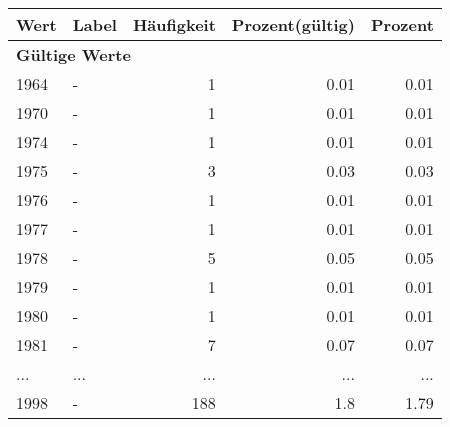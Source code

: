     \begin{longtable}{lXrrr}
     \toprule
     \textbf{Wert} & \textbf{Label} & \textbf{Häufigkeit} & \textbf{Prozent(gültig)} & \textbf{Prozent} \\
     \endhead
     \midrule
     \multicolumn{5}{l}{\textbf{Gültige Werte}}\\
        1964 & \multicolumn{1}{X}{-} & %
          \num{1} &
          \num[round-mode=places,round-precision=2]{0.01} &
          \num[round-mode=places,round-precision=2]{0.01} \\
        1970 & \multicolumn{1}{X}{-} & %
          \num{1} &
          \num[round-mode=places,round-precision=2]{0.01} &
          \num[round-mode=places,round-precision=2]{0.01} \\
        1974 & \multicolumn{1}{X}{-} & %
          \num{1} &
          \num[round-mode=places,round-precision=2]{0.01} &
          \num[round-mode=places,round-precision=2]{0.01} \\
        1975 & \multicolumn{1}{X}{-} & %
          \num{3} &
          \num[round-mode=places,round-precision=2]{0.03} &
          \num[round-mode=places,round-precision=2]{0.03} \\
        1976 & \multicolumn{1}{X}{-} & %
          \num{1} &
          \num[round-mode=places,round-precision=2]{0.01} &
          \num[round-mode=places,round-precision=2]{0.01} \\
        1977 & \multicolumn{1}{X}{-} & %
          \num{1} &
          \num[round-mode=places,round-precision=2]{0.01} &
          \num[round-mode=places,round-precision=2]{0.01} \\
        1978 & \multicolumn{1}{X}{-} & %
          \num{5} &
          \num[round-mode=places,round-precision=2]{0.05} &
          \num[round-mode=places,round-precision=2]{0.05} \\
        1979 & \multicolumn{1}{X}{-} & %
          \num{1} &
          \num[round-mode=places,round-precision=2]{0.01} &
          \num[round-mode=places,round-precision=2]{0.01} \\
        1980 & \multicolumn{1}{X}{-} & %
          \num{1} &
          \num[round-mode=places,round-precision=2]{0.01} &
          \num[round-mode=places,round-precision=2]{0.01} \\
        1981 & \multicolumn{1}{X}{-} & %
          \num{7} &
          \num[round-mode=places,round-precision=2]{0.07} &
          \num[round-mode=places,round-precision=2]{0.07} \\
       ... & ... & ... & ... & ... \\
        1998 & \multicolumn{1}{X}{-} & %
          \num{188} &
          \num[round-mode=places,round-precision=2]{1.8} &
          \num[round-mode=places,round-precision=2]{1.79} \\


\end{longtable}
